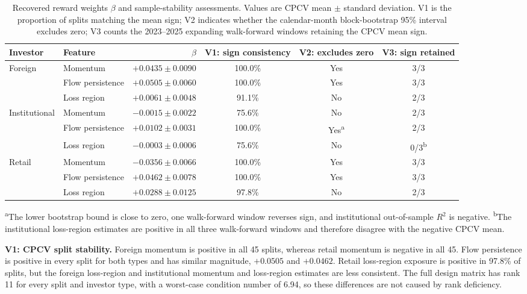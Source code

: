 \documentclass[sigconf,anonymous,review]{acmart}
\begin{document}
\begin{table}[t]
\caption{Recovered reward weights $\beta$ and sample-stability assessments.
Values are CPCV mean $\pm$ standard deviation. V1 is the proportion of splits
matching the mean sign; V2 indicates whether the calendar-month block-bootstrap
95\% interval excludes zero; V3 counts the 2023--2025 expanding walk-forward
windows retaining the CPCV mean sign.}
\label{tab:beta}
\begin{tabular}{llrccc}
\toprule
Investor & Feature & $\beta$ & V1: sign consistency & V2: excludes zero & V3: sign retained \\
\midrule
Foreign       & Momentum         & $+0.0435 \pm 0.0090$ & 100.0\% & Yes                     & 3/3 \\
              & Flow persistence & $+0.0505 \pm 0.0060$ & 100.0\% & Yes                     & 3/3 \\
              & Loss region      & $+0.0061 \pm 0.0048$ & 91.1\%  & No                      & 2/3 \\
\midrule
Institutional & Momentum         & $-0.0015 \pm 0.0022$ & 75.6\%  & No                      & 2/3 \\
              & Flow persistence & $+0.0102 \pm 0.0031$ & 100.0\% & Yes\textsuperscript{a}  & 2/3 \\
              & Loss region      & $-0.0003 \pm 0.0006$ & 75.6\%  & No                      & 0/3\textsuperscript{b} \\
\midrule
Retail        & Momentum         & $-0.0356 \pm 0.0066$ & 100.0\% & Yes                     & 3/3 \\
              & Flow persistence & $+0.0462 \pm 0.0078$ & 100.0\% & Yes                     & 3/3 \\
              & Loss region      & $+0.0288 \pm 0.0125$ & 97.8\%  & No                      & 2/3 \\
\bottomrule
\end{tabular}

\vspace{2pt}
{\footnotesize \textsuperscript{a}The lower bootstrap bound is close to zero, one
walk-forward window reverses sign, and institutional out-of-sample $R^2$ is
negative. \textsuperscript{b}The institutional loss-region estimates are positive
in all three walk-forward windows and therefore disagree with the negative CPCV
mean.}
\end{table}

\textbf{V1: CPCV split stability.} Foreign momentum is positive in all 45
splits, whereas retail momentum is negative in all 45. Flow persistence is
positive in every split for both types and has similar magnitude, $+0.0505$ and
$+0.0462$. Retail loss-region exposure is positive in 97.8\% of splits, but the
foreign loss-region and institutional momentum and loss-region estimates are
less consistent. The full design matrix has rank 11 for every split and investor
type, with a worst-case condition number of 6.94, so these differences are not
caused by rank deficiency.
\end{document}
